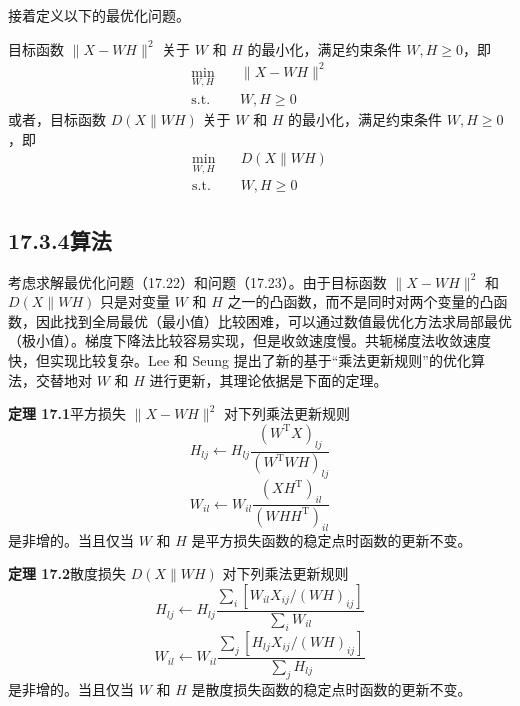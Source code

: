 \documentclass[UTF8, 12pt, fontset=fandol, oneside]{ctexart}
\begin{document}
接着定义以下的最优化问题。

目标函数 $\|X-WH\|^2$ 关于 $W$ 和 $H$ 的最小化，满足约束条件 $W,H\geqslant 0$，即
\begin{equation}
\begin{aligned}
\min_{W,H}\quad &\|X-WH\|^2\\
\text{s.t.}\quad &W,H\geqslant 0
\end{aligned}
\tag{17.22}
\end{equation}
或者，目标函数 $D(X\|WH)$ 关于 $W$ 和 $H$ 的最小化，满足约束条件 $W,H\geqslant 0$，即
\begin{equation}
\begin{aligned}
\min_{W,H}\quad &D(X\|WH)\\
\text{s.t.}\quad &W,H\geqslant 0
\end{aligned}
\tag{17.23}
\end{equation}

\subsection*{17.3.4\quad 算法}

考虑求解最优化问题（17.22）和问题（17.23）。由于目标函数 $\|X-WH\|^2$ 和 $D(X\|WH)$ 只是对变量 $W$ 和 $H$ 之一的凸函数，而不是同时对两个变量的凸函数，因此找到全局最优（最小值）比较困难，可以通过数值最优化方法求局部最优（极小值）。梯度下降法比较容易实现，但是收敛速度慢。共轭梯度法收敛速度快，但实现比较复杂。Lee 和 Seung 提出了新的基于“乘法更新规则”的优化算法，交替地对 $W$ 和 $H$ 进行更新，其理论依据是下面的定理。

\noindent\textbf{定理 17.1}\quad 平方损失 $\|X-WH\|^2$ 对下列乘法更新规则
\begin{equation}
H_{lj}\leftarrow H_{lj}\frac{(W^{\mathrm{T}}X)_{lj}}{(W^{\mathrm{T}}WH)_{lj}}
\tag{17.24}
\end{equation}
\begin{equation}
W_{il}\leftarrow W_{il}\frac{(XH^{\mathrm{T}})_{il}}{(WHH^{\mathrm{T}})_{il}}
\tag{17.25}
\end{equation}
是非增的。当且仅当 $W$ 和 $H$ 是平方损失函数的稳定点时函数的更新不变。

\noindent\textbf{定理 17.2}\quad 散度损失 $D(X\|WH)$ 对下列乘法更新规则
\begin{equation}
H_{lj}\leftarrow H_{lj}\frac{\displaystyle\sum_i[W_{il}X_{ij}/(WH)_{ij}]}{\displaystyle\sum_i W_{il}}
\tag{17.26}
\end{equation}
\begin{equation}
W_{il}\leftarrow W_{il}\frac{\displaystyle\sum_j[H_{lj}X_{ij}/(WH)_{ij}]}{\displaystyle\sum_j H_{lj}}
\tag{17.27}
\end{equation}
是非增的。当且仅当 $W$ 和 $H$ 是散度损失函数的稳定点时函数的更新不变。
\end{document}

